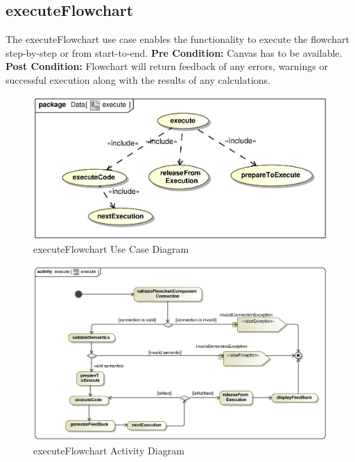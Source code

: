 \documentclass[12pt,a4paper,titlepage]{article}
\begin{document}
\newpage
\subsection{executeFlowchart}
The executeFlowchart use case enables the functionality to execute the flowchart step-by-step or from start-to-end.\newline\newline
\textbf{Pre Condition:} Canvas has to be available.\newline\newline
\textbf{Post Condition:} Flowchart will return feedback of any errors, warnings or successful execution along with the results of any calculations.

\begin{figure}[H]
  \centering
\includegraphics[width=500px]{execute.eps}
\caption{executeFlowchart Use Case Diagram}
\end{figure}

\begin{figure}[H]
  \centering
\includegraphics[width=500px]{executeAct.eps}
\caption{executeFlowchart Activity Diagram}
\end{figure}
\end{document}
